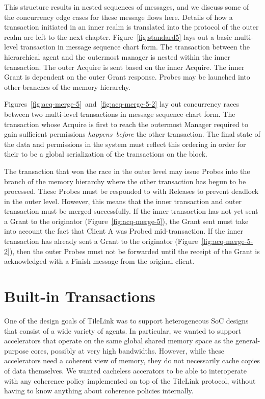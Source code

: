 This structure results in nested sequences of messages, and we discuss some of the concurrency edge cases for these message flows here.
Details of how a transaction initiated in an inner realm is translated into the protocol of the outer realm are left to the next chapter.
Figure~\ref{fig:standard5} lays out a basic multi-level transaction in message sequence chart form.
The transaction between the hierarchical agent and the outermost manager is nested within the inner transaction.
The outer Acquire is sent based on the inner Acquire. 
The inner Grant is dependent on the outer Grant response.
Probes may be launched into other branches of the memory hierarchy.

Figures~\ref{fig:acq-merge-5}~and~\ref{fig:acq-merge-5-2} lay out concurrency races between two multi-level transactions in message sequence chart form.
The transaction whose Acquire is first to reach the outermost Manager required to gain sufficient permissions 
\emph{happens~before} the other transaction.
The final state of the data and permissions in the system must reflect this ordering
in order for their to be a global serialization of the transactions on the block.

The transaction that won the race in the outer level may issue Probes into the branch of the memory hierarchy where the other transaction has begun to be processed.
These Probes must be responded to with Releases to prevent deadlock in the outer level.
However, this means that the inner transaction and outer transaction must be merged successfully.
If the inner transaction has not yet sent a Grant to the originator (Figure~\ref{fig:acq-merge-5}),
the Grant sent must take into account the fact that Client A was Probed mid-transaction.
If the inner transaction has already sent a Grant to the originator (Figure~\ref{fig:acq-merge-5-2}),
then the outer Probes must not be forwarded until the receipt of the Grant is acknowledged with a Finish message from the original client.

\section{Built-in Transactions}
\label{s.uncached}

One of the design goals of TileLink was to support heterogeneous SoC designs that consist of a wide variety of agents.
In particular, we wanted to support accelerators that operate on the same global shared memory space as the general-purpose cores, possibly at very high bandwidths.
However, while these accelerators need a coherent view of memory, they do not necessarily cache copies of data themselves.
We wanted cacheless accerators to be able to interoperate with any coherence policy implemented on top of the TileLink protocol, without having to know anything about coherence policies internally.

